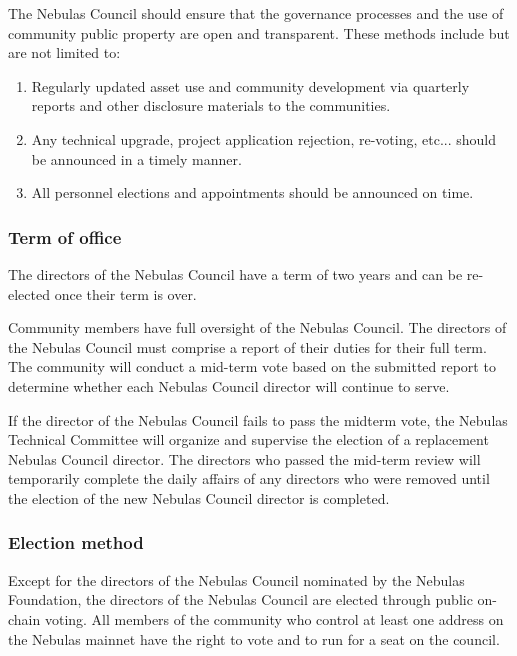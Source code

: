 The Nebulas Council should ensure that the governance processes and the use of community public property are open and transparent. These methods include but are not limited to:

\begin{enumerate}
	\item Regularly updated asset use and community development via quarterly reports and other disclosure materials to the communities.
	\item Any technical upgrade, project application rejection, re-voting, etc... should be announced in a timely manner.
	\item All personnel elections and appointments should be announced on time.
\end{enumerate}

\subsubsection{Term of office}

The directors of the Nebulas Council have a term of two years and can be re-elected once their term is over.

\vspace{2em}


Community members have full oversight of the Nebulas Council. The directors of the Nebulas Council must comprise a report of their duties for their full term. The community will conduct a mid-term vote based on the submitted report to determine whether each Nebulas Council director will continue to serve.

If the director of the Nebulas Council fails to pass the midterm vote, the Nebulas Technical Committee will organize and supervise the election of a replacement Nebulas Council director. The directors who passed the mid-term review will temporarily complete the daily affairs of any directors who were removed until the election of the new Nebulas Council director is completed.

\subsubsection{Election method}

Except for the directors of the Nebulas Council nominated by the Nebulas Foundation, the directors of the Nebulas Council are elected through public on-chain voting. All members of the community who control at least one address on the Nebulas mainnet have the right to vote and to run for a seat on the council.

